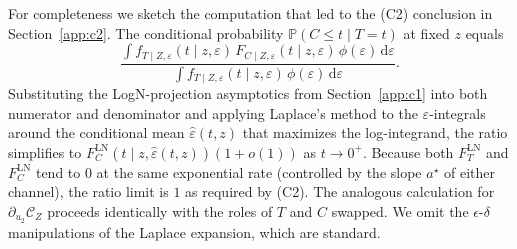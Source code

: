 For completeness we sketch the computation that led to the (C2)
conclusion in Section~\ref{app:c2}. The conditional probability
$\mathbb{P}(C \le t \mid T = t)$ at fixed $z$ equals
\[
    \frac{
        \int f_{T \mid Z, \varepsilon}(t \mid z, \varepsilon)\,
              F_{C \mid Z, \varepsilon}(t \mid z, \varepsilon)\,
              \phi(\varepsilon)\, \mathrm{d}\varepsilon
    }{
        \int f_{T \mid Z, \varepsilon}(t \mid z, \varepsilon)\,
              \phi(\varepsilon)\, \mathrm{d}\varepsilon
    }.
\]
Substituting the LogN-projection asymptotics from
Section~\ref{app:c1} into both numerator and denominator and applying
Laplace's method to the $\varepsilon$-integrals around the conditional
mean
$\widehat{\varepsilon}(t, z)$ that maximizes the log-integrand, the
ratio simplifies to
$F_C^{\text{LN}}(t \mid z, \widehat{\varepsilon}(t, z)) (1 + o(1))$ as
$t \to 0^+$. Because both $F_T^{\text{LN}}$ and $F_C^{\text{LN}}$ tend
to $0$ at the same exponential rate (controlled by the slope $a^\star$
of either channel), the ratio limit is $1$ as required by (C2). The
analogous calculation for $\partial_{u_2} \mathcal{C}_Z$ proceeds
identically with the roles of $T$ and $C$ swapped. We omit the
$\epsilon$-$\delta$ manipulations of the Laplace expansion, which are
standard.

